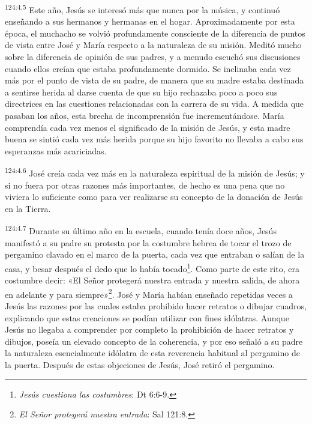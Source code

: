 \par
\textsuperscript{124:4.5} Este año, Jesús se interesó más que nunca por la música, y continuó enseñando a sus hermanos y hermanas en el hogar. Aproximadamente por esta época, el muchacho se volvió profundamente consciente de la diferencia de puntos de vista entre José y María respecto a la naturaleza de su misión. Meditó mucho sobre la diferencia de opinión de sus padres, y a menudo escuchó sus discusiones cuando ellos creían que estaba profundamente dormido. Se inclinaba cada vez más por el punto de vista de su padre, de manera que su madre estaba destinada a sentirse herida al darse cuenta de que su hijo rechazaba poco a poco sus directrices en las cuestiones relacionadas con la carrera de su vida. A medida que pasaban los años, esta brecha de incomprensión fue incrementándose. María comprendía cada vez menos el significado de la misión de Jesús, y esta madre buena se sintió cada vez más herida porque su hijo favorito no llevaba a cabo sus esperanzas más acariciadas.

\par
\textsuperscript{124:4.6} José creía cada vez más en la naturaleza espiritual de la misión de Jesús; y si no fuera por otras razones más importantes, de hecho es una pena que no viviera lo suficiente como para ver realizarse su concepto de la donación de Jesús en la Tierra.

\par
\textsuperscript{124:4.7} Durante su último año en la escuela, cuando tenía doce años, Jesús manifestó a su padre su protesta por la costumbre hebrea de tocar el trozo de pergamino clavado en el marco de la puerta, cada vez que entraban o salían de la casa, y besar después el dedo que lo había tocado\footnote{\textit{Jesús cuestiona las costumbres}: Dt 6:6-9.}. Como parte de este rito, era costumbre decir: «El Señor protegerá nuestra entrada y nuestra salida, de ahora en adelante y para siempre»\footnote{\textit{El Señor protegerá nuestra entrada}: Sal 121:8.}. José y María habían enseñado repetidas veces a Jesús las razones por las cuales estaba prohibido hacer retratos o dibujar cuadros, explicando que estas creaciones se podían utilizar con fines idólatras. Aunque Jesús no llegaba a comprender por completo la prohibición de hacer retratos y dibujos, poseía un elevado concepto de la coherencia, y por eso señaló a su padre la naturaleza esencialmente idólatra de esta reverencia habitual al pergamino de la puerta. Después de estas objeciones de Jesús, José retiró el pergamino.

